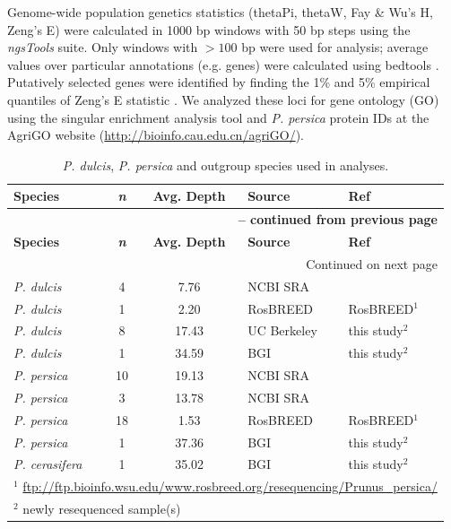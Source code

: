 \documentclass[12pt]{article}
\begin{document}
Genome-wide population genetics statistics (thetaPi, thetaW, Fay \& Wu's H, Zeng's E) were calculated in 1000 bp windows with 50 bp steps using the \emph{ngsTools} \citep{fumagalli2014ngstools} suite. 
%
Only windows with $>100$ bp were used for analysis; average values over particular annotations (e.g. genes) were calculated using bedtools \citep{quinlan2010bedtools}.
%
Putatively selected genes were identified by finding the 1\% and 5\% empirical quantiles of Zeng's E statistic \citep{zeng2006statistical}.
%
We analyzed these loci for gene ontology (GO) using the singular enrichment analysis tool and \emph{P. persica} protein IDs at the AgriGO website (\url{http://bioinfo.cau.edu.cn/agriGO/}).
%
\begin{center}
\begin{longtable}{lccll}
\caption{\emph{P. dulcis}, \emph{P. persica} and outgroup species used in analyses.} \label{samples} \\
\hline \hline 
\multicolumn{1}{l}{\textbf{Species}} &
\multicolumn{1}{c}{\textbf{\emph{n}}} &
\multicolumn{1}{c}{\textbf{Avg. Depth}} &
\multicolumn{1}{l}{\textbf{Source}} &
\multicolumn{1}{l}{\textbf{Ref}}\\
\hline 
\endfirsthead

\multicolumn{5}{r}{{\bfseries \tablename\ \thetable{} -- continued from previous page}} \\
\hline
\multicolumn{1}{l}{\textbf{Species}} &
\multicolumn{1}{c}{\textbf{\emph{n}}} &
\multicolumn{1}{c}{\textbf{Avg. Depth}} &
\multicolumn{1}{l}{\textbf{Source}} &
\multicolumn{1}{l}{\textbf{Ref}} \\
\hline 
\endhead
%
\hline
\multicolumn{5}{r}{{Continued on next page}} \\
\hline \hline
\endfoot
%
\endlastfoot
%
	\emph{P. dulcis} &4 &7.76 &NCBI SRA &\citealp{koepke2013comparative}\\
	\emph{P. dulcis} &1 &2.20 &RosBREED &RosBREED$^{1}$\\
	\emph{P. dulcis} &8 &17.43 &UC Berkeley &this study$^{2}$\\
	\emph{P. dulcis} &1 &34.59 &BGI &this study$^{2}$\\
	\emph{P. persica} &10 &19.13 &NCBI SRA &\citealp{verde2013high} \\
	\emph{P. persica} &3 &13.78 &NCBI SRA &\citealp{ahmad2011whole} \\
	\emph{P. persica} &18 &1.53 &RosBREED &RosBREED$^{1}$ \\
	\emph{P. persica} &1 &37.36 &BGI &this study$^{2}$\\
	\emph{P. cerasifera} &1 &35.02 &BGI &this study$^{2}$\\ \hline \hline
	\multicolumn{5}{l}{$^{1}$ \url{ftp://ftp.bioinfo.wsu.edu/www.rosbreed.org/resequencing/Prunus_persica/}}\\
	\multicolumn{5}{l}{$^{2}$ newly resequenced sample(s)}
\end{longtable}
\end{center}
\end{document}
